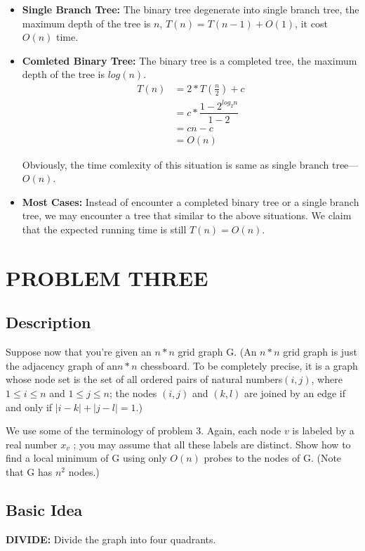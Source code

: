 \documentclass[UTF8,a4paper,12pt]{article}
\begin{document}
	\begin{itemize}
		\item{\textbf{Single Branch Tree: }} The binary tree degenerate into single branch tree, the maximum depth of the tree is $ n $, $ T(n) = T(n-1)+O(1) $, it cost $ O(n) $ time.
		
		\item{\textbf{Comleted Binary Tree: }} The binary tree is a completed tree, the maximum depth of the tree is $ log(n) $.
		\begin{align*}
			T(n) &= 2*T(\frac{n}{2})+c \\
			&= c*\dfrac{1-2^{log_{2}n}}{1-2}\\
			&= cn-c\\ 
			&= O(n) 
		\end{align*}
		
		\setlength{\parindent}{2em}Obviously, the time comlexity of this situation is same as single branch tree---$ O(n) $.
		
		\item{\textbf{Most Cases:}} Instead of encounter a completed binary tree or a single branch tree, we may encounter a tree that similar to the above situations. We claim that the expected running time is still $ T(n) = O(n) $.
	\end{itemize}
	

	
	\newpage
	\section{PROBLEM THREE}
	\subsection{Description}
		Suppose now that you’re given an $ n * n $ grid graph G. (An $ n * n $ grid graph is just the adjacency graph of an$  n * n $ chessboard. To be completely precise, it is a graph whose node set is the set of all ordered pairs of natural numbers$  (i, j) $, where $ 1 \le i \le n $ and $ 1 \le j \le n $; the nodes $ (i, j) $ and $ (k, l) $ are joined by an edge if and only if $ |i - k| + |j - l| = 1 $.)
	
		We use some of the terminology of problem 3. Again, each node $ v  $ is labeled by a real number $ x_v $ ; you may assume that all these labels are distinct. Show how to find a local minimum of G using only $ O(n) $ probes to the nodes of G. (Note that G has $ n^2 $ nodes.)
	\subsection{Basic Idea}
		\textbf{DIVIDE: }Divide the graph into four quadrants.
		
\end{document}
